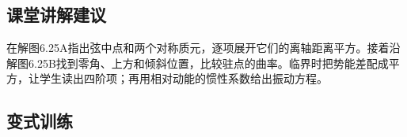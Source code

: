 \documentclass[UTF8,fontset=fandol,a4paper,11pt]{ctexart}
\begin{document}


\subsection*{课堂讲解建议}

在解图6.25A指出弦中点和两个对称质元，逐项展开它们的离轴距离平方。接着沿解图6.25B找到零角、上方和倾斜位置，比较驻点的曲率。临界时把势能差配成平方，让学生读出四阶项；再用相对动能的惯性系数给出振动方程。




\subsection*{变式训练}
\end{document}
